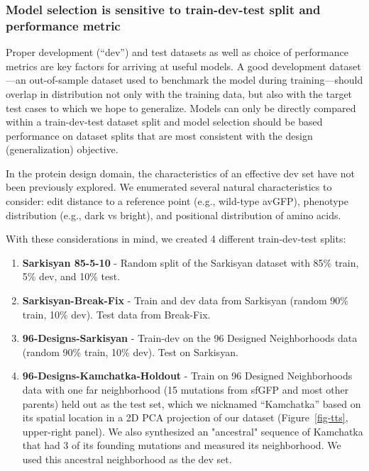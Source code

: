 \subsubsection{Model selection is sensitive to train-dev-test split and performance metric}

Proper development (``dev'') and test datasets as well as choice of performance metrics are key factors for arriving at useful models. A good development dataset---an out-of-sample dataset used to benchmark the model during training---should overlap in distribution not only with the training data, but also with the target test cases to which we hope to generalize. Models can only be directly compared within a train-dev-test dataset split and model selection should be based performance on dataset splits that are most consistent with the design (generalization) objective.

In the protein design domain, the characteristics of an effective dev set have not been previously explored. We enumerated several natural characteristics to consider: edit distance to a reference point (e.g., wild-type avGFP), phenotype distribution (e.g., dark vs bright), and positional distribution of amino acids.

With these considerations in mind, we created 4 different train-dev-test splits:

\begin{enumerate}
   \item \textbf{Sarkisyan 85-5-10} - Random split of the Sarkisyan dataset with 85\% train, 5\% dev, and 10\% test.
   \item \textbf{Sarkisyan-Break-Fix} - Train and dev data from Sarkisyan (random 90\% train, 10\% dev). Test data from Break-Fix.
   \item \textbf{96-Designs-Sarkisyan} - Train-dev on the 96 Designed Neighborhoods data (random 90\% train, 10\% dev). Test on Sarkisyan.
   \item \textbf{96-Designs-Kamchatka-Holdout} - Train on 96 Designed Neighborhoods data with one far neighborhood (15 mutations from sfGFP and most other parents) held out as the test set, which we nicknamed “Kamchatka” based on its spatial location in a 2D PCA projection of our dataset (Figure~\ref{fig-tts}, upper-right panel). We also synthesized an "ancestral" sequence of Kamchatka that had 3 of its founding mutations and measured its neighborhood. We used this ancestral neighborhood as the dev set.
\end{enumerate}

